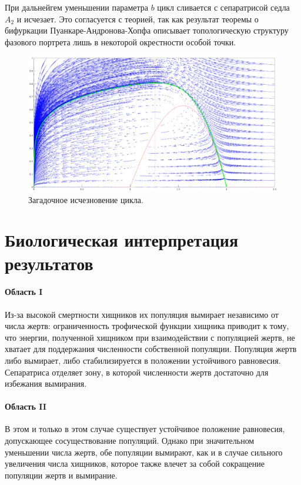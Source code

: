 \documentclass[16pt]{article}
\begin{document}
При дальнейгем уменьшении параметра $b$ цикл сливается с сепаратрисой седла $A_2$ и исчезает. Это 
согласуется с теорией, так как результат
теоремы о бифуркации Пуанкаре-Андронова-Хопфа описывает топологическую структуру фазового портрета лишь в
некоторой окрестности особой точки.

\newpage

\begin{figure}[h]
\begin{center}
\includegraphics[width=140mm]{sep.eps}
\caption{Загадочное исчезновение цикла.}
\end{center}
\end{figure}

\section{Биологическая интерпретация результатов}

\paragraph{Область I} Из-за высокой смертности хищников их популяция вымирает независимо от числа жертв:
ограниченность трофической функции хищника приводит к тому, что энергии, полученной хищником при взаимодействии с популяцией жертв,
не хватает для поддержания численности собственной популяции. Популяция жертв либо вымирает, либо стабилизируется
в положении устойчивого равновесия. Сепаратриса отделяет
зону, в которой численности жертв достаточно для избежания вымирания.

\paragraph{Область II} В этом и только в этом случае существует устойчивое положение равновесия, допускающее сосуществование 
популяций. Однако при значительном уменьшении числа жертв, обе популяции вымирают, как и в случае сильного
увеличения числа хищников, которое также влечет за собой сокращение популяции жертв и вымирание. 
\end{document}
